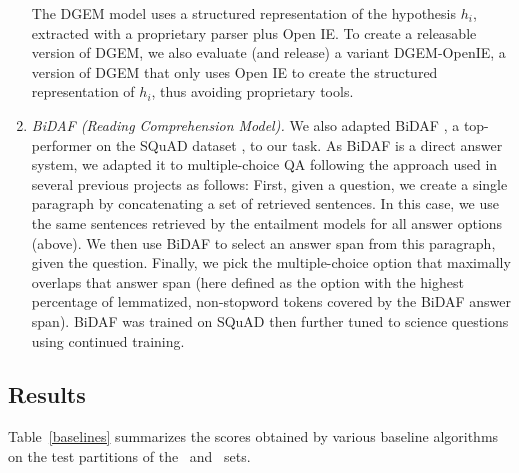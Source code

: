 \begin{enumerate}
The DGEM model uses a structured representation of the hypothesis $h_{i}$, extracted with a proprietary parser plus Open IE. To create a releasable version of DGEM, we also evaluate (and release) a variant DGEM-OpenIE, a version of DGEM that only uses Open IE to create the structured representation of $h_{i}$, thus avoiding proprietary tools.

\item \textit{BiDAF (Reading Comprehension Model).}
  We also adapted BiDAF \cite{Seo2016BidirectionalAF}, a top-performer on the SQuAD dataset \cite{rajpurkar2016squad}, to our task.
  As BiDAF is a direct answer system, we adapted it to multiple-choice QA following the approach used in several previous projects
  \cite{khashabi2018question,welbl2017crowdsourcing,kembhavi2017you} as follows:
  First, given a question, we create a single paragraph by concatenating a set of retrieved sentences. In this case, we use
  the same sentences retrieved by the entailment models for all answer options (above).
  We then use BiDAF to select an answer span from this paragraph, given the question. Finally, we pick the multiple-choice option that maximally overlaps that answer span (here defined as the option with the highest percentage of lemmatized, non-stopword tokens covered by the BiDAF answer span). BiDAF was trained on SQuAD then further tuned to science questions %
   using continued training.%
\end{enumerate}

\subsection{Results}

Table~\ref{baselines} summarizes the scores obtained by various baseline algorithms on
the test partitions of the \Challenge~and \Additional~sets.


